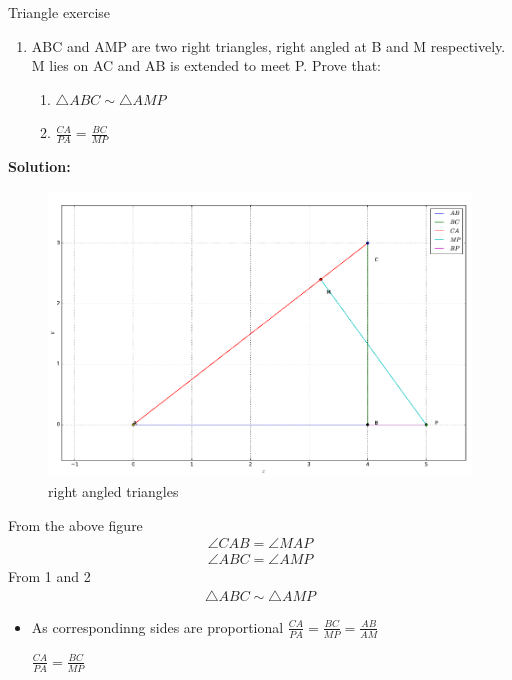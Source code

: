 \begin{frame}{Triangle exercise}
\begin{enumerate}
\item ABC and AMP are two right triangles, right
angled at B and M respectively. M lies on AC
and AB is extended to meet P. Prove that:
\seti
\begin{enumerate}
\item $\triangle{ABC} \sim \triangle{AMP}$
\item $\frac{CA}{PA}=\frac{BC}{MP}$
\end{enumerate}
\end{enumerate}
\textbf{Solution:}
\begin{figure}[!ht]
\resizebox{.4\linewidth}{!}
{

\includegraphics[scale=0.4]{./figs/triangle/tri.png}
}
\caption{right angled triangles}
\label{fig:foo}
\end{figure}
\end{frame}
\begin{frame}
From the above figure
\begin{align}
	\angle{CAB} =\angle{MAP} \\
	\angle{ABC} = \angle{AMP}
\end{align}
From 1 and 2
\begin{align}
\triangle{ABC} \sim \triangle{AMP}
\end{align}
\begin{itemize}
\item As correspondinng sides are proportional
$\frac{CA}{PA}=\frac{BC}{MP}=\frac{AB}{AM}$

\begin{center}
$\frac{CA}{PA}=\frac{BC}{MP}$
\end{center}
\end{itemize}
\end{frame}